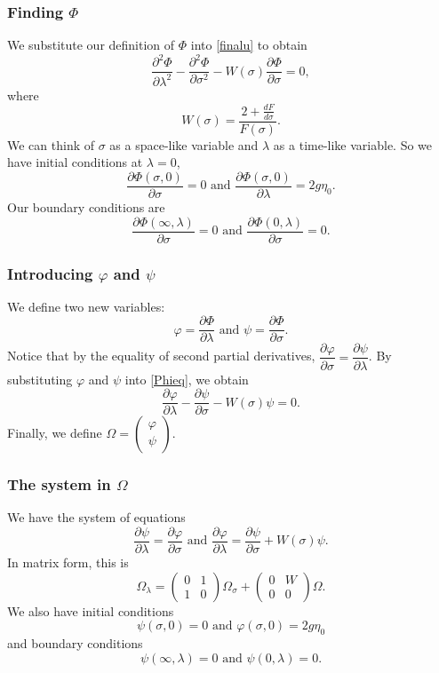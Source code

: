 \begin{frame}
\frametitle{Finding $\Phi$}
We substitute our definition of $\Phi$ into \eqref{finalu} to obtain
\begin{equation}\label{Phieq}
\frac{\partial^2 \Phi}{\partial \lambda^2} - \frac{\partial^2 \Phi}{\partial \sigma^2} - W(\sigma) \frac{\partial \Phi}{\partial \sigma} = 0,
\end{equation}
where
\[
W(\sigma) = \frac{2 + \frac{dF}{d\sigma}}{F(\sigma)}.
\]
We can think of $\sigma$ as a space-like variable and $\lambda$ as a time-like variable. So we have initial conditions at $\lambda = 0$,
\[
\frac{\partial \Phi(\sigma,0)}{\partial \sigma} = 0 \text{ and } \frac{\partial \Phi(\sigma,0)}{\partial \lambda} = 2g\eta_0.
\]
Our boundary conditions are
\[
\frac{\partial \Phi(\infty,\lambda)}{\partial \sigma} = 0 \text{ and } \frac{\partial \Phi(0,\lambda)}{\partial \sigma} = 0.
\]
\end{frame}

\begin{frame}
\frametitle{Introducing $\varphi$ and $\psi$}
We define two new variables:
\[
\varphi = \frac{\partial \Phi}{\partial \lambda} \text{ and } \psi = \frac{\partial \Phi}{\partial \sigma}.
\]
Notice that by the equality of second partial derivatives, $\dfrac{\partial \varphi}{\partial \sigma} = \dfrac{\partial \psi}{\partial \lambda}$.
By substituting $\varphi$ and $\psi$ into \eqref{Phieq}, we obtain
\[
\frac{\partial \varphi}{\partial \lambda} - \frac{\partial \psi}{\partial \sigma} - W(\sigma) \psi = 0.
\]
Finally, we define $\Omega = \begin{pmatrix} \varphi \\ \psi \end{pmatrix}$.
\end{frame}

\begin{frame}
\frametitle{The system in $\Omega$}
We have the system of equations
\[
\dfrac{\partial \psi}{\partial \lambda} = \dfrac{\partial \varphi}{\partial \sigma} \text{ and } \frac{\partial \varphi}{\partial \lambda} = \frac{\partial \psi}{\partial \sigma} + W(\sigma) \psi.
\]
In matrix form, this is
\[
\Omega_\lambda = \begin{pmatrix} 0 & 1 \\ 1 & 0 \end{pmatrix} \Omega_\sigma + \begin{pmatrix} 0 & W \\ 0 & 0 \end{pmatrix} \Omega.
\]
We also have initial conditions
\[
\psi(\sigma, 0) = 0 \text{ and } \varphi(\sigma,0) = 2g\eta_0
\]
and boundary conditions
\[
\psi(\infty,\lambda) = 0 \text{ and } \psi(0,\lambda) = 0.
\]
\end{frame}

